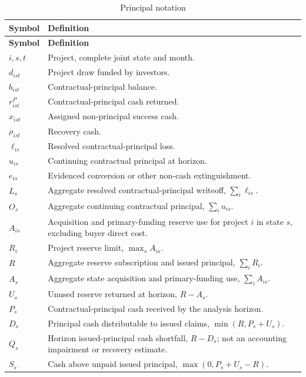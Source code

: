 \documentclass[11pt,a4paper]{article}
\begin{document}
\begin{longtable}{@{}P{0.18\textwidth}P{0.73\textwidth}@{}}
\caption{Principal notation}\label{tab:notation}\\
\toprule
\textbf{Symbol} & \textbf{Definition} \\
\midrule
\endfirsthead
\toprule
\textbf{Symbol} & \textbf{Definition} \\
\midrule
\endhead
\(i,s,t\) & Project, complete joint state and month. \\
\(d_{ist}\) & Project draw funded by investors. \\
\(b_{ist}\) & Contractual-principal balance. \\
\(r^P_{ist}\) & Contractual-principal cash returned. \\
\(x_{ist}\) & Assigned non-principal success cash. \\
\(\rho_{ist}\) & Recovery cash. \\
\(\ell_{is}\) & Resolved contractual-principal loss. \\
\(u_{is}\) & Continuing contractual principal at horizon. \\
\(e_{is}\) & Evidenced conversion or other non-cash extinguishment. \\
\(L_s\) & Aggregate resolved contractual-principal writeoff, \(\sum_i\ell_{is}\). \\
\(O_s\) & Aggregate continuing contractual principal, \(\sum_i u_{is}\). \\
\(A_{is}\) & Acquisition and primary-funding reserve use for project \(i\) in state \(s\), excluding buyer direct cost. \\
\(R_i\) & Project reserve limit, \(\max_s A_{is}\). \\
\(R\) & Aggregate reserve subscription and issued principal, \(\sum_iR_i\). \\
\(A_s\) & Aggregate state acquisition and primary-funding use, \(\sum_iA_{is}\). \\
\(U_s\) & Unused reserve returned at horizon, \(R-A_s\). \\
\(P_s\) & Contractual-principal cash received by the analysis horizon. \\
\(D_s\) & Principal cash distributable to issued claims, \(\min(R,P_s+U_s)\). \\
\(Q_s\) & Horizon issued-principal cash shortfall, \(R-D_s\); not an accounting impairment or recovery estimate. \\
\(S_s\) & Cash above unpaid issued principal, \(\max(0,P_s+U_s-R)\). \\

\end{longtable}
\end{document}
